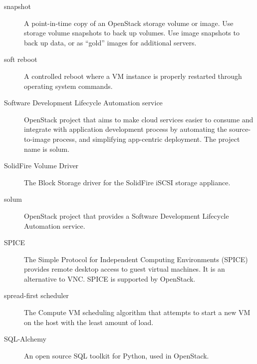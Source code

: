 \documentclass[letterpaper,10pt,english]{sphinxmanual}
\begin{document}
\begin{description}
\item[{snapshot}] \leavevmode{}\label{_source/glossary:term-snapshot}
A point-in-time copy of an OpenStack storage volume or image.
Use storage volume snapshots to back up volumes. Use image snapshots
to back up data, or as ``gold'' images for additional servers.

\item[{soft reboot}] \leavevmode{}\label{_source/glossary:term-soft-reboot}
A controlled reboot where a VM instance is properly restarted
through operating system commands.

\item[{Software Development Lifecycle Automation service}] \leavevmode{}\label{_source/glossary:term-software-development-lifecycle-automation-service}
OpenStack project that aims to make cloud services easier to
consume and integrate with application development process
by automating the source-to-image process, and simplifying
app-centric deployment. The project name is solum.

\item[{SolidFire Volume Driver}] \leavevmode{}\label{_source/glossary:term-solidfire-volume-driver}
The Block Storage driver for the SolidFire iSCSI storage
appliance.

\item[{solum}] \leavevmode{}\label{_source/glossary:term-solum}
OpenStack project that provides a Software Development
Lifecycle Automation service.

\item[{SPICE}] \leavevmode{}\label{_source/glossary:term-spice}
The Simple Protocol for Independent Computing Environments
(SPICE) provides remote desktop access to guest virtual machines. It
is an alternative to VNC. SPICE is supported by OpenStack.

\item[{spread-first scheduler}] \leavevmode{}\label{_source/glossary:term-spread-first-scheduler}
The Compute VM scheduling algorithm that attempts to start a new
VM on the host with the least amount of load.

\item[{SQL-Alchemy}] \leavevmode{}\label{_source/glossary:term-sql-alchemy}
An open source SQL toolkit for Python, used in OpenStack.


\end{description}
\end{document}
